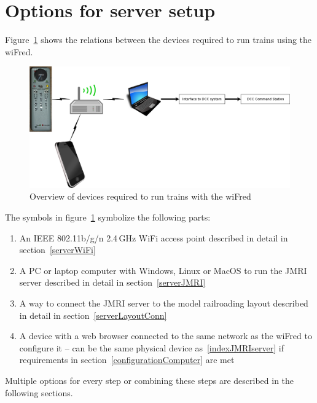 \documentclass[11pt,a4paper]{scrartcl}
\begin{document}
\clearpage

\section{Options for server setup} \label{serverSetup}

Figure~\ref{runningTrains} shows the relations between the devices required to run trains using the wiFred.

\begin{figure}[tbh]
  \centering
  \includegraphics[width=0.99 \textwidth]{images/runningTrains}
  \caption{Overview of devices required to run trains with the wiFred}
  \label{runningTrains}
\end{figure}

The symbols in figure~\ref{runningTrains} symbolize the following parts:

\begin{enumerate}
\item An IEEE 802.11b/g/n 2.4\,GHz WiFi access point described in detail in section~\ref{serverWiFi} \label{indexWiFi}
\item A PC or laptop computer with Windows, Linux or MacOS to run the JMRI server described in detail in section~\ref{serverJMRI} \label{indexJMRIserver}
\item A way to connect the JMRI server to the model railroading layout described in detail in section~\ref{serverLayoutConn} \label{indexLocoBuffer}
\item A device with a web browser connected to the same network as the wiFred to configure it -- can be the same physical device as~\ref{indexJMRIserver} if requirements in section~\ref{configurationComputer} are met \label{indexConfigurationComputer}
\end{enumerate}

Multiple options for every step or combining these steps are described in the following sections.
\end{document}
